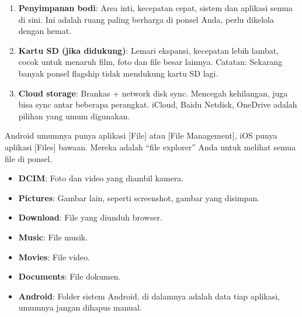 


\begin{enumerate}
  \item \textbf{Penyimpanan bodi}: Area inti, kecepatan cepat, sistem dan aplikasi semua di sini. Ini adalah ruang paling berharga di ponsel Anda, perlu dikelola dengan hemat.
  \item \textbf{Kartu SD (jika didukung)}: Lemari ekspansi, kecepatan lebih lambat, cocok untuk menaruh film, foto dan file besar lainnya. Catatan: Sekarang banyak ponsel flagship tidak mendukung kartu SD lagi.
  \item \textbf{Cloud storage}: Brankas + network disk sync. Mencegah kehilangan, juga bisa sync antar beberapa perangkat. iCloud, Baidu Netdisk, OneDrive adalah pilihan yang umum digunakan.
\end{enumerate}


Android umumnya punya aplikasi [File] atau [File Management], iOS punya aplikasi [Files] bawaan. Mereka adalah “file explorer” Anda untuk melihat semua file di ponsel.


\begin{itemize}
  \item \textbf{DCIM}: Foto dan video yang diambil kamera.
  \item \textbf{Pictures}: Gambar lain, seperti screenshot, gambar yang disimpan.
  \item \textbf{Download}: File yang diunduh browser.
  \item \textbf{Music}: File musik.
  \item \textbf{Movies}: File video.
  \item \textbf{Documents}: File dokumen.
  \item \textbf{Android}: Folder sistem Android, di dalamnya adalah data tiap aplikasi, umumnya jangan dihapus manual.
\end{itemize}

